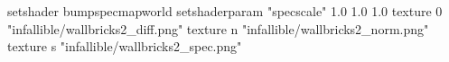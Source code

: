 setshader bumpspecmapworld
setshaderparam "specscale" 1.0 1.0 1.0
texture 0 "infallible/wallbricks2_diff.png"
texture n "infallible/wallbricks2_norm.png"
texture s "infallible/wallbricks2_spec.png"